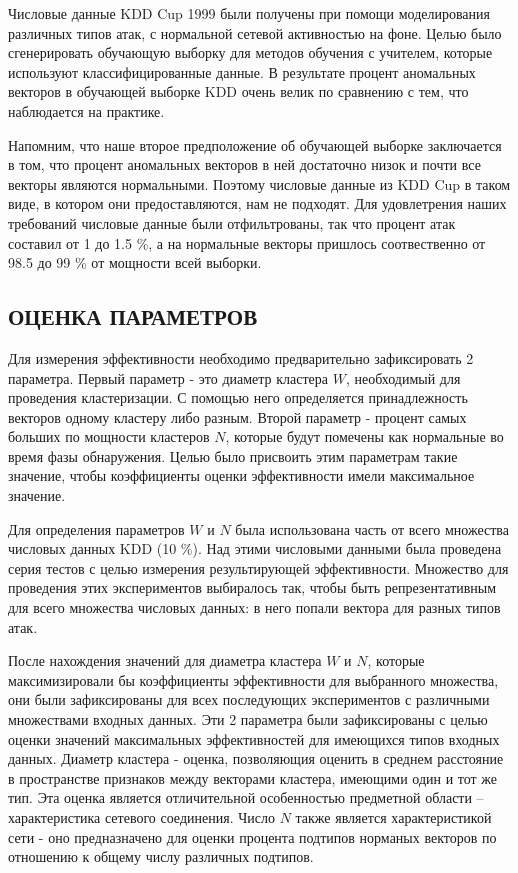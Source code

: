 \documentclass[12pt,a4paper]{article}
\begin{document}
Числовые данные KDD Cup 1999 были получены при помощи моделирования различных типов атак,
с нормальной сетевой активностью на фоне. Целью было сгенерировать обучающую выборку для методов
обучения с учителем, которые используют классифицированные данные. В результате процент аномальных
векторов в обучающей выборке KDD очень велик по сравнению с тем, что наблюдается на практике.

Напомним, что наше второе предположение об обучающей выборке заключается в том, что процент 
аномальных векторов в ней достаточно низок и почти все векторы являются нормальными. Поэтому
числовые данные из KDD Cup в таком виде, в котором они предоставляются, нам не подходят.
Для удовлетрения наших требований числовые данные были отфильтрованы, так что процент атак
составил от 1 до 1.5 \%, а на нормальные векторы пришлось соотвественно от 98.5 до 99 \% от
мощности всей выборки.

\subsection{ОЦЕНКА ПАРАМЕТРОВ}

Для измерения эффективности необходимо предварительно зафиксировать 2 параметра. Первый параметр -
это диаметр кластера $W$, необходимый для проведения кластеризации. С помощью него определяется принадлежность
векторов одному кластеру либо разным. Второй параметр - процент самых больших по мощности кластеров $N$,
которые будут помечены как нормальные во время фазы обнаружения. Целью было присвоить этим параметрам такие
значение, чтобы коэффициенты оценки эффективности имели максимальное значение.

Для определения параметров $W$ и $N$ была использована часть от всего множества числовых данных KDD (10 \%).
Над этими числовыми данными была проведена серия тестов с целью измерения результирующей эффективности.
Множество для проведения этих экспериментов выбиралось так, чтобы быть репрезентативным для всего множества
числовых данных: в него попали вектора для разных типов атак.

После нахождения значений для диаметра кластера $W$ и $N$, которые максимизировали бы коэффициенты эффективности
для выбранного множества, они были зафиксированы для всех последующих экспериментов с различными множествами
входных данных. Эти 2 параметра были зафиксированы с целью оценки значений максимальных эффективностей для
имеющихся типов входных данных. Диаметр кластера - оценка, позволяющия оценить в среднем расстояние в пространстве
признаков между векторами кластера, имеющими один и тот же тип. Эта оценка является отличительной особенностью
предметной области -- характеристика сетевого соединения. Число $N$ также является характеристикой сети - оно
предназначено для оценки процента подтипов норманых векторов по отношению к общему числу различных подтипов.
\end{document}
